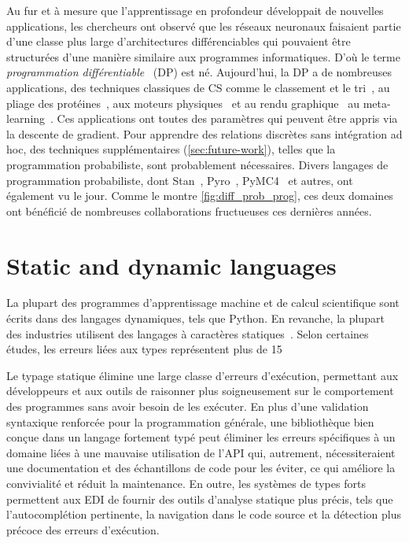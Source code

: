Au fur et à mesure que l'apprentissage en profondeur développait de nouvelles applications, les chercheurs ont observé que les réseaux neuronaux faisaient partie d'une classe plus large d'architectures différenciables qui pouvaient être structurées d'une manière similaire aux programmes informatiques. D'où le terme \textit{programmation différentiable}~\citep{olah2015neural, baydin2016differentiable, plotkin2018some} (DP) est né. Aujourd'hui, la DP a de nombreuses applications, des techniques classiques de CS comme le classement et le tri~\citep{cuturi2019differentiable, blondel2020fast}, au pliage des protéines~\citep{alquraishi2018end}, aux moteurs physiques~\citep{hu2019difftaichi, de2018end, degrave2016differentiable} et au rendu graphique~\citep{loper2014opendr} au meta-learning~\citep{liu2018darts, chandra2019gradient}. Ces applications ont toutes des paramètres qui peuvent être appris via la descente de gradient. Pour apprendre des relations discrètes sans intégration ad hoc, des techniques supplémentaires (\autoref{sec:future-work}), telles que la programmation probabiliste, sont probablement nécessaires. Divers langages de programmation probabiliste, dont Stan~\citep{carpenter2017stan}, Pyro~\citep{bingham2019pyro}, PyMC4~\citep{kochurov2019pymc4} et autres, ont également vu le jour. Comme le montre \autoref{fig:diff_prob_prog}, ces deux domaines ont bénéficié de nombreuses collaborations fructueuses ces dernières années.

\section{Static and dynamic languages}

La plupart des programmes d'apprentissage machine et de calcul scientifique sont écrits dans des langages dynamiques, tels que Python. En revanche, la plupart des industries utilisent des langages à caractères statiques~\citep{github}. Selon certaines études, les erreurs liées aux types représentent plus de 15 %

Le typage statique élimine une large classe d'erreurs d'exécution, permettant aux développeurs et aux outils de raisonner plus soigneusement sur le comportement des programmes sans avoir besoin de les exécuter. En plus d'une validation syntaxique renforcée pour la programmation générale, une bibliothèque bien conçue dans un langage fortement typé peut éliminer les erreurs spécifiques à un domaine liées à une mauvaise utilisation de l'API qui, autrement, nécessiteraient une documentation et des échantillons de code pour les éviter, ce qui améliore la convivialité et réduit la maintenance. En outre, les systèmes de types forts permettent aux EDI de fournir des outils d'analyse statique plus précis, tels que l'autocomplétion pertinente, la navigation dans le code source et la détection plus précoce des erreurs d'exécution.


